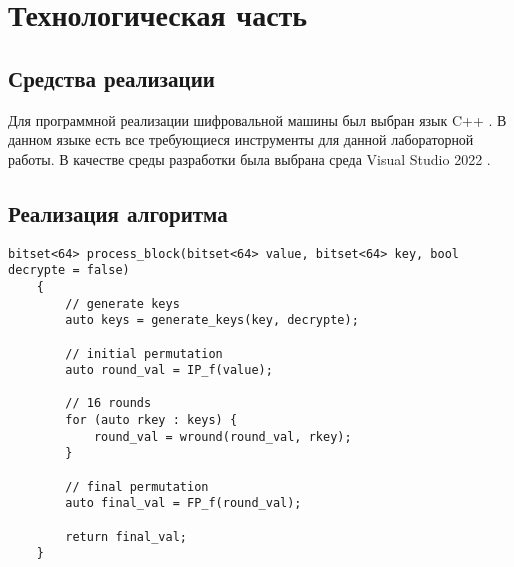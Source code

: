 \chapter{Технологическая часть}

\section{Средства реализации}

Для программной реализации шифровальной машины был выбран язык C++ \cite{cpp}.
В данном языке есть все требующиеся инструменты для данной лабораторной работы.
В качестве среды разработки была выбрана среда Visual Studio 2022 \cite{clion}.




\section{Реализация алгоритма}

\begin{lstlisting}[label=lst:process-block,caption=Реализация алгоритма DES]
	bitset<64> process_block(bitset<64> value, bitset<64> key, bool decrypte = false)
	{
		// generate keys
		auto keys = generate_keys(key, decrypte);
		
		// initial permutation
		auto round_val = IP_f(value);
		
		// 16 rounds
		for (auto rkey : keys) {
			round_val = wround(round_val, rkey);
		}
		
		// final permutation
		auto final_val = FP_f(round_val);
		
		return final_val;
	}
\end{lstlisting}


